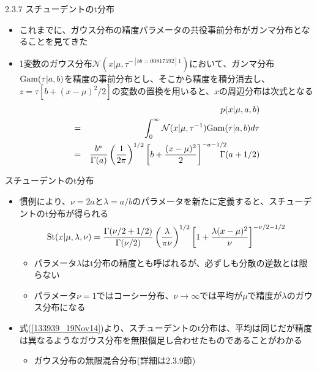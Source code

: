 \begin{frame}{2.3.7 スチューデントのt分布}
 \begin{itemize}
  \item これまでに、ガウス分布の精度パラメータの共役事前分布がガンマ分布となることを見てきた
  \item 1変数のガウス分布$\mathcal{N}(x|\mu, \tau^{-[bb=0 0 817 592]1})$において、ガンマ分布${\rm Gam}(\tau|a,b)$を精度の事前分布とし、そこから精度を積分消去し、$z=\tau[b+(x-\mu)^2/2]$の変数の置換を用いると、$x$の周辺分布は次式となる
        \begin{eqnarray}
         && p(x|\mu,a,b) \nonumber \\
         &=& \int_0^\infty \mathcal{N}(x|\mu,\tau^{-1}){\rm Gam}(\tau|a,b)d\tau\label{133939_19Nov14} \\
         &= & \frac{b^a}{\Gamma(a)}\left(\frac{1}{2\pi}\right)^{1/2}\left[b+\frac{(x-\mu)^2}{2}\right]^{-a-1/2}\!\!\!\!\!\!\Gamma(a+1/2)
        \end{eqnarray}
 \end{itemize}
\end{frame}

\begin{frame}{スチューデントのt分布}
 \begin{itemize}
  \item 慣例により、$\nu=2a$と$\lambda=a/b$のパラメータを新たに定義すると、\alert{スチューデントのt分布}が得られる
        \begin{equation}
         {\rm St}(x|\mu,\lambda,\nu) = \frac{\Gamma(\nu/2+1/2)}{\Gamma(\nu/2)}\left(\frac{\lambda}{\pi\nu}\right)^{1/2}\left[1+\frac{\lambda(x-\mu)^2}{\nu}\right]^{-\nu/2-1/2}
        \end{equation}
        \begin{itemize}
         \item パラメータ$\lambda$はt分布の精度とも呼ばれるが、必ずしも分散の逆数とは限らない
         \item パラメータ$\nu=1$ではコーシー分布、$\nu\rightarrow\infty$では平均が$\mu$で精度が$\lambda$のガウス分布になる
        \end{itemize}
  \item 式(\ref{133939_19Nov14})より、スチューデントのt分布は、平均は同じだが精度は異なるようなガウス分布を無限個足し合わせたものであることがわかる
        \begin{itemize}
         \item ガウス分布の無限混合分布(詳細は2.3.9節)
        \end{itemize}
 \end{itemize}
\end{frame}

